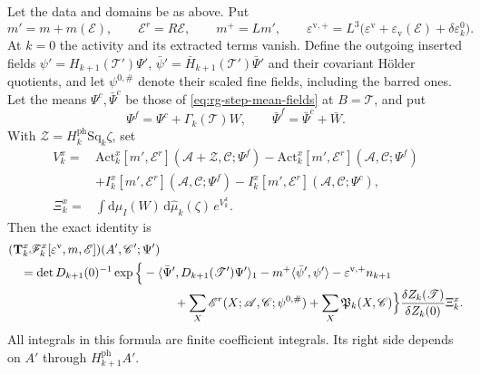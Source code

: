 \documentclass[11pt,letterpaper,reqno]{amsart}
\newcommand{\dd}{\mathrm d}
\begin{document}
\begin{proposition}\label{prop:rg-step-density-identity}
Let the data and domains be as above. Put
\[
 m'=m+m(\mathscr E),\qquad \mathscr E^r=R\mathscr E,\qquad
 m^+=Lm',\qquad
 \varepsilon^{\mathrm v,+}
       =L^3\big(\varepsilon^{\mathrm v}
              +\varepsilon_{\mathrm v}(\mathscr E)+\delta\varepsilon_k^0\big).
\]
At $k=0$ the activity and its extracted terms vanish.
Define the outgoing inserted fields
$\psi'=H_{k+1}(\mathscr T')\Psi'$,
$\bar\psi'=\bar H_{k+1}(\mathscr T')\bar\Psi'$ and
their covariant H\"older quotients, and let
$\psi^{0,\#}$ denote their scaled fine fields,
including the barred ones.
Let the means $\Psi^c,\bar\Psi^c$ be those of
\eqref{eq:rg-step-mean-fields} at $B=\mathscr T$,
and put
\[
 \Psi^f=\Psi^c+\Gamma_k(\mathscr T)W,\qquad
 \bar\Psi^f=\bar\Psi^c+\bar W.
\]
With $\mathscr Z=H_k^{\mathrm{ph}}\mathrm{Sq}_k\zeta$,
set
\begin{equation}\label{eq:rg-step-fluctuation-exponent}
 \begin{split}
 V_k^x={}&
       \mathrm{Act}_k^x[m',\mathscr E^r]
                    (\mathscr A+\mathscr Z,\mathscr C;\Psi^f)
       -\mathrm{Act}_k^x[m',\mathscr E^r]
                    (\mathscr A,\mathscr C;\Psi^f)\\
       &+I_k^x[m',\mathscr E^r](\mathscr A,\mathscr C;\Psi^f)
       -I_k^x[m',\mathscr E^r](\mathscr A,\mathscr C;\Psi^c),\\
 \Xi_k^x={}&\int\dd\mu_I(W)\,\dd\widehat\mu_k(\zeta)\,e^{V_k^x}.
 \end{split}
\end{equation}
Then the exact identity is
\begin{equation}\label{eq:rg-step-density-identity}
 \begin{split}
 &(\mathbf T_k^x\mathscr F_k^x
                [\varepsilon^{\mathrm v},m,\mathscr E])
                                      (A',\mathscr C';\Psi')\\
 &\quad=\det D_{k+1}(0)^{-1}
       \exp\Big\{-\langle\bar\Psi',D_{k+1}(\mathscr T')\Psi'\rangle_1
                  -m^+\langle\bar\psi',\psi'\rangle
                  -\varepsilon^{\mathrm v,+}n_{k+1}\\
 &\hspace{48mm}
          +\sum_X\mathscr E^r(X;\mathscr A,\mathscr C;\psi^{0,\#})
          +\sum_X\mathfrak P_k(X,\mathscr C)\Big\}
                     \frac{\delta Z_k(\mathscr T)}{\delta Z_k(0)}\Xi_k^x.
 \end{split}
\end{equation}
All integrals in this formula are finite coefficient
integrals. Its right side depends on $A'$ through
$H_{k+1}^{\mathrm{ph}}A'$.
\end{proposition}
\end{document}
